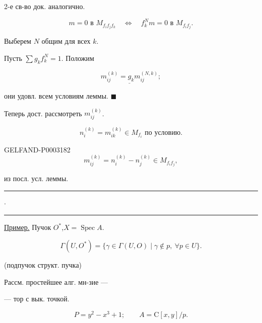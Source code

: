 2-е св-во док. аналогично.

\begin{equation*}m=0\text{ в }M_{f_i f_j f_k}\quad\Longleftrightarrow\quad f_k^N m=0\text{ в }M_{f_i f_j}.\end{equation*}

Выберем $N$ общим для всех $k$.

Пусть $\sum g_k f_k^N=1$. Положим

\begin{equation*}\underline{m_{ij}^{(k)}=g_k m_{ij}^{(N,k)}};\end{equation*}

они удовл. всем условиям леммы. $\blacksquare$

Теперь дост. рассмотреть $m_{ij}^{(k)}$.

\begin{equation*}n_i^{(k)}=m_{ik}^{(k)}\in M_{f_i}\text{ по условию.}\end{equation*}

\begin{GelfandAdjacentEvidence}{GELFAND-P000318}{2}
\begin{equation*}m_{ij}^{(k)}=n_i^{(k)}-n_j^{(k)}\in M_{f_i f_j},\end{equation*}

\end{GelfandAdjacentEvidence}


из посл. усл. леммы.

\begin{center}\rule{20mm}{.6pt}\quad$\cdot$\quad\rule{20mm}{.6pt}\end{center}

\uline{Пример.} Пучок $O^*$,\quad $X=\operatorname{Spec}A$.

\begin{equation*}\Gamma(U,O^*)=\{\gamma\in\Gamma(U,O)\mid\gamma\notin p,\ \forall p\in U\}.\end{equation*}

(подпучок структ. пучка)

Рассм. простейшее алг. мн-зие ---

--- тор с вык. точкой.

\begin{equation*}P=y^2-x^3+1;\qquad A=\mathrm C[x,y]/p.\end{equation*}

